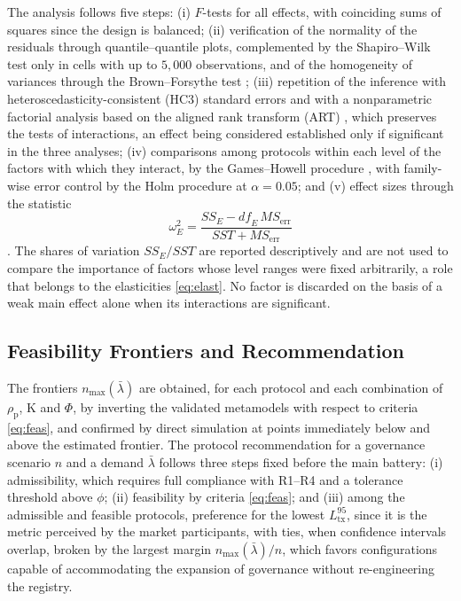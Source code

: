 \documentclass[english]{sbc2025}%
\newcommand{\Lt}{L^{95}_{\mathrm{tx}}}
\newcommand{\nmax}{n_{\max}}
\begin{document}
The analysis follows five steps: (i) $F$-tests for all effects, with coinciding sums of squares since the design is balanced; (ii) verification of the normality of the residuals through quantile--quantile plots, complemented by the Shapiro--Wilk test \citep{Shapiro1965} only in cells with up to $5{,}000$ observations, and of the homogeneity of variances through the Brown--Forsythe test \citep{Brown1974}; (iii) repetition of the inference with heteroscedasticity-consistent (HC3) standard errors \citep{Long2000} and with a nonparametric factorial analysis based on the aligned rank transform (ART) \citep{Wobbrock2011}, which preserves the tests of interactions, an effect being considered established only if significant in the three analyses; (iv) comparisons among protocols within each level of the factors with which they interact, by the Games--Howell procedure \citep{Games1976}, with family-wise error control by the Holm procedure \citep{Holm1979} at $\alpha = 0.05$; and (v) effect sizes through the statistic
\begin{equation}
\omega^{2}_{E} = \frac{SS_{E} - \mathit{df}_{E}\, MS_{\mathrm{err}}}{SST + MS_{\mathrm{err}}}
\label{eq:omega}
\end{equation}
\citep{Olejnik2003}. The shares of variation $SS_{E}/SST$ \citep{Jain1991} are reported descriptively and are not used to compare the importance of factors whose level ranges were fixed arbitrarily, a role that belongs to the elasticities \eqref{eq:elast}. No factor is discarded on the basis of a weak main effect alone when its interactions are significant.

\subsection{Feasibility Frontiers and Recommendation}

The frontiers $\nmax(\bar{\lambda})$ are obtained, for each protocol and each combination of $\rho_{\mathrm{p}}$, K and $\Phi$, by inverting the validated metamodels with respect to criteria \eqref{eq:feas}, and confirmed by direct simulation at points immediately below and above the estimated frontier. The protocol recommendation for a governance scenario $n$ and a demand $\bar{\lambda}$ follows three steps fixed before the main battery: (i) admissibility, which requires full compliance with R1--R4 and a tolerance threshold above $\phi$; (ii) feasibility by criteria \eqref{eq:feas}; and (iii) among the admissible and feasible protocols, preference for the lowest $\Lt$, since it is the metric perceived by the market participants, with ties, when confidence intervals overlap, broken by the largest margin $\nmax(\bar{\lambda})/n$, which favors configurations capable of accommodating the expansion of governance without re-engineering the registry.
\end{document}
